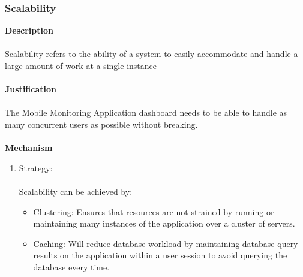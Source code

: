 \documentclass[hidelinks, 12pt, oneside]{article}
\begin{document}
			\subsubsection*{Scalability}
			\textbf{Description} \\\\
			Scalability refers to the ability of a system to easily accommodate and handle a large amount of work at a single instance \\\\
			\textbf{Justification}\\\\
			The Mobile Monitoring Application dashboard needs to be able to handle as many concurrent users as possible without breaking.\\\\
			\textbf{Mechanism}
				\begin{enumerate}
					\item Strategy: \\\\
						Scalability can be achieved by:
						\begin{itemize}
							\item Clustering: Ensures that resources are not strained by running or maintaining many instances of the application over a cluster of servers.  
							\item Caching: Will reduce database workload by maintaining database query results on the application within a user session to avoid querying the database every time. 
						\end{itemize}
				\end{enumerate}	
			\newpage
\end{document}
